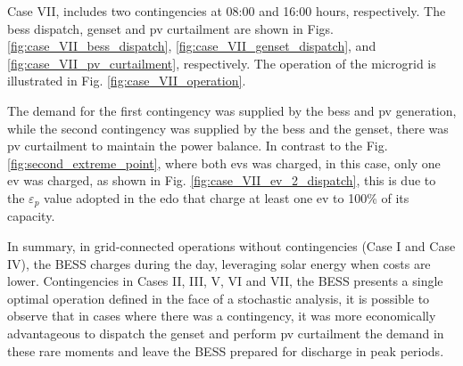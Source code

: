 \documentclass[preprint, 10pt, 5p]{elsarticle}
\begin{document}
Case VII, includes two contingencies at 08:00 and 16:00 hours, respectively. 
The \gls{bess} dispatch, genset and \gls{pv} curtailment are shown in
Figs. \ref{fig:case_VII_bess_dispatch}, \ref{fig:case_VII_genset_dispatch},
and \ref{fig:case_VII_pv_curtailment}, respectively. The operation of the
microgrid is illustrated in Fig. \ref{fig:case_VII_operation}. 

The demand for the first contingency was supplied by the \gls{bess} and
\gls{pv} generation, while the second contingency was supplied by the
\gls{bess} and the \gls{genset}, there was \gls{pv} curtailment 
to maintain the power balance. In contrast to the 
Fig. \ref{fig:second_extreme_point}, where both \glspl{ev} was charged,
in this case, only one \gls{ev} was charged, as shown 
in Fig. \ref{fig:case_VII_ev_2_dispatch}, this is due to the
$\varepsilon_{p}$ value adopted in the \gls{edo} that charge at least one
\gls{ev} to 100\% of its capacity.

In summary, in grid-connected operations without contingencies 
(Case I and Case IV), the BESS charges during the day, leveraging solar 
energy when costs are lower. Contingencies in Cases II, III, V, VI and VII, 
the BESS presents a single optimal operation defined in the face of a 
stochastic analysis, it is possible to observe that in cases where there was 
a contingency, it was more economically advantageous to dispatch 
the \gls{genset} and perform \gls{pv} curtailment the demand in these rare 
moments and leave the BESS prepared for discharge in peak periods.
\end{document}
